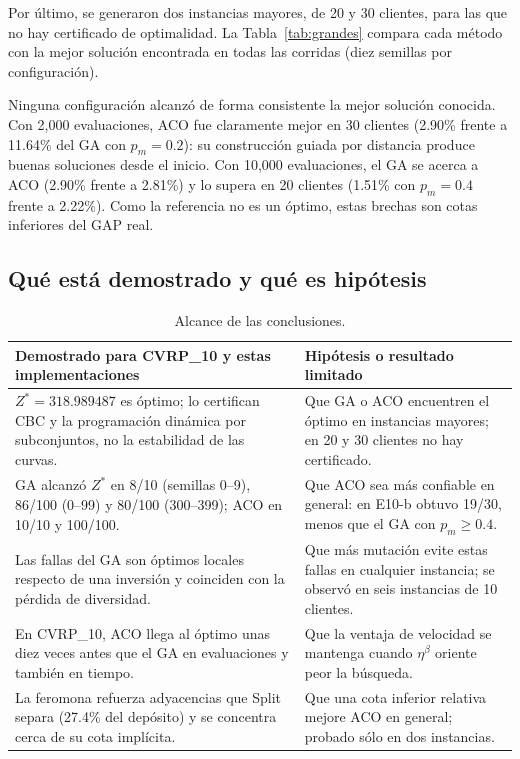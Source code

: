 \documentclass[11pt,a4paper]{article}
\numberwithin{equation}{section}
\begin{document}
Por último, se generaron dos instancias mayores, de 20 y 30 clientes, para las que no hay certificado de optimalidad. La Tabla~\ref{tab:grandes} compara cada método con la mejor solución encontrada en todas las corridas (diez semillas por configuración).

\begin{table}[H]\centering\small
\caption{Instancias de 20 y 30 clientes: GAP medio (y peor) en \% respecto a la mejor solución conocida, que no está certificada (695.947 y 847.617). Tiempos medidos en el equipo Linux.}\label{tab:grandes}

\end{table}

Ninguna configuración alcanzó de forma consistente la mejor solución conocida. Con 2,000 evaluaciones, ACO fue claramente mejor en 30 clientes (2.90\% frente a 11.64\% del GA con \(p_m=0.2\)): su construcción guiada por distancia produce buenas soluciones desde el inicio. Con 10,000 evaluaciones, el GA se acerca a ACO (2.90\% frente a 2.81\%) y lo supera en 20 clientes (1.51\% con \(p_m=0.4\) frente a 2.22\%). Como la referencia no es un óptimo, estas brechas son cotas inferiores del GAP real.

\subsection{Qué está demostrado y qué es hipótesis}

\begin{table}[H]\centering\small
\caption{Alcance de las conclusiones.}\label{tab:alcance}
\begin{tabular}{p{7.6cm}p{7.4cm}}\toprule
Demostrado para CVRP\_10 y estas implementaciones & Hipótesis o resultado limitado\\\midrule
\(Z^*=318.989487\) es óptimo; lo certifican CBC y la programación dinámica por subconjuntos, no la estabilidad de las curvas. & Que GA o ACO encuentren el óptimo en instancias mayores; en 20 y 30 clientes no hay certificado.\\
GA alcanzó \(Z^*\) en 8/10 (semillas 0--9), 86/100 (0--99) y 80/100 (300--399); ACO en 10/10 y 100/100. & Que ACO sea más confiable en general: en E10-b obtuvo 19/30, menos que el GA con \(p_m\ge0.4\).\\
Las fallas del GA son óptimos locales respecto de una inversión y coinciden con la pérdida de diversidad. & Que más mutación evite estas fallas en cualquier instancia; se observó en seis instancias de 10 clientes.\\
En CVRP\_10, ACO llega al óptimo unas diez veces antes que el GA en evaluaciones y también en tiempo. & Que la ventaja de velocidad se mantenga cuando \(\eta^\beta\) oriente peor la búsqueda.\\
La feromona refuerza adyacencias que Split separa (27.4\% del depósito) y se concentra cerca de su cota implícita. & Que una cota inferior relativa mejore ACO en general; probado sólo en dos instancias.\\\bottomrule
\end{tabular}
\end{table}
\end{document}
